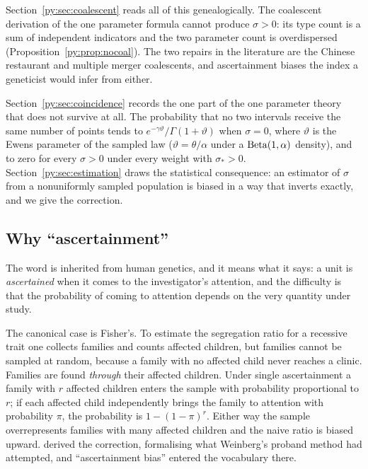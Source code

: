 Section~\ref{py:sec:coalescent} reads all of this genealogically. The coalescent derivation of the
one parameter formula cannot produce $\sigma > 0$: its type count is a sum of independent indicators
and the two parameter count is overdispersed (Proposition~\ref{py:prop:nocoal}). The two repairs in the
literature are the Chinese restaurant and multiple merger coalescents, and ascertainment biases the
index a geneticist would infer from either.

Section~\ref{py:sec:coincidence} records the one part of the one parameter theory that does not
survive at all. The probability that no two intervals receive the same number of points tends to
$e^{-\gamma\vartheta}/\Gamma(1+\vartheta)$ when $\sigma = 0$, where $\vartheta$ is the Ewens parameter of the sampled law ($\vartheta = \theta/\alpha$ under a $\mathrm{Beta}(1,\alpha)$ density), and to zero for every $\sigma > 0$
under every weight with $\sigma_* > 0$. Section~\ref{py:sec:estimation} draws the statistical consequence: an estimator of
$\sigma$ from a nonuniformly sampled population is biased in a way that inverts exactly, and we
give the correction.

\subsection{Why ``ascertainment''}
\label{py:sec:whyascertainment}

The word is inherited from human genetics, and it means what it says: a unit is \emph{ascertained}
when it comes to the investigator's attention, and the difficulty is that the probability of coming
to attention depends on the very quantity under study.

The canonical case is Fisher's. To estimate the segregation ratio for a recessive trait one collects
families and counts affected children, but families cannot be sampled at random, because a family
with no affected child never reaches a clinic. Families are found \emph{through} their affected
children. Under single ascertainment a family with $r$ affected children enters the sample with
probability proportional to $r$; if each affected child independently brings the family to attention
with probability $\pi$, the probability is $1-(1-\pi)^{r}$. Either way the sample overrepresents
families with many affected children and the naive ratio is biased upward.
\citet{py:fisher1934} derived the correction, formalising what Weinberg's proband method had attempted,
and ``ascertainment bias'' entered the vocabulary there.

